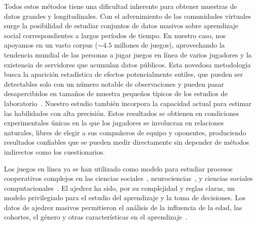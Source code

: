 \documentclass[a4paper,11pt]{book}
\theoremstyle{definition}
\begin{document}

Todos estos m\'etodos tiene una dificultad inherente para obtener muestras de datos grandes y longitudinales.
%
Con el advenimiento de las comunidades virtuales surge la posibilidad de estudiar conjuntos de datos masivos sobre aprendizaje social correspondientes a largos per\'iodos de tiempo.
%
En nuestro caso, nos apoyamos en un vasto corpus ($\sim4.5$ millones de juegos), aprovechando la tendencia mundial de las personas a jugar juegos en l\'inea de varios jugadores y la existencia de servidores que acumulan datos p\'ublicos.
%
Esta novedosa metodolog\'ia busca la aparici\'on estad\'istica de efectos potencialmente sutiles, que pueden ser detectables solo con un n\'umero notable de observaciones y pueden pasar desapercibidos en tama\~nos de muestra peque\~nos t\'ipicos de los estudios de laboratorio~\cite{slezak2012-doNotFearYourOpponent}.
%
Nuestro estudio tambi\'en incorpora la capacidad actual para estimar las habilidades con alta precisi\'on.
%
Estos resultados se obtienen en condiciones experimentales \'unicas en la que los jugadores se involucran en relaciones naturales, libres de elegir a sus compa\~neros de equipo y oponentes, produciendo resultados confiables que se pueden medir directamente sin depender de m\'etodos indirectos como los cuestionarios.


Los juegos en l\'inea ya se han utilizado como modelo para estudiar procesos cooperativos complejos en las ciencias sociales~\cite{Beheim2014,Johnson2009-onlineGuildsOfflineGangs}, neurociencias~\cite{slezak2012-doNotFearYourOpponent,sigman2010-chess}, y ciencias sociales computacionales~\cite{delong2013-phd_teamChemistry, shim2010-teamPerformancePrediction}.
%
El ajedrez ha sido, por su complejidad y reglas claras, un modelo privilegiado para el estudio del aprendizaje y la toma de decisiones.
%
Los datos de ajedrez masivos permitieron el an\'alisis de la influencia de la edad, las cohortes, el g\'enero y otras caracter\'isticas en el aprendizaje~\cite{chabris_glickman2006-sexDifferencesChessPerformance, roring2007-expertiseInChessAcrossLifeSpan,vaci2016-chessDatabasesAgePerformance}.

\end{document}
